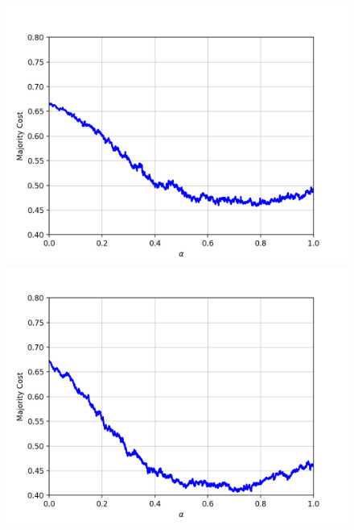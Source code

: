 \begin{figure}[h]
\centering
\begin{minipage}{.3\textwidth}
  \centering
  \includegraphics[width=\linewidth]{plots/mnist-ac-0}
\end{minipage}
\begin{minipage}{.3\textwidth}
  \centering
  \includegraphics[width=\linewidth]{plots/mnist-ac-1}
\end{minipage}
\begin{minipage}{.3\textwidth}
  \centering

\end{minipage}
\end{figure}

